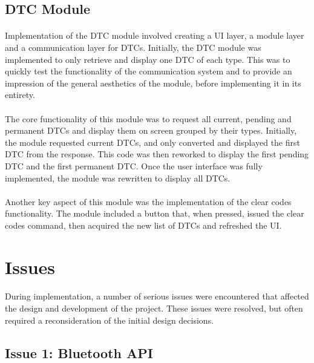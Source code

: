 	\subsection{DTC Module}
		\paragraph{}{
		Implementation of the DTC module involved creating a UI layer, a module layer and a communication layer for DTCs.	Initially, the DTC module was implemented to only retrieve and display one DTC of each type. This was to quickly test the functionality of the communication system and to provide an impression of the general aesthetics of the module, before implementing it in its entirety.
		}		
		\paragraph{}{
		The core functionality of this module was to request all current, pending and permanent DTCs and display them on screen grouped by their types. Initially, the module requested current DTCs, and only converted and displayed the first DTC from the response. This code was then reworked to display the first pending DTC and the first permanent DTC. Once the user interface was fully implemented, the module was rewritten to display all DTCs.
		}
		\paragraph{}{
		Another key aspect of this module was the implementation of the clear codes functionality. The module included a button that, when pressed, issued the clear codes command, then acquired the new list of DTCs and refreshed the UI.
		}
		
\section{Issues}
	\paragraph{}{
	During implementation, a number of serious issues were encountered that affected the design and development of the project. These issues were resolved, but often required a reconsideration of the initial design decisions.
	}
	
	\subsection{Issue 1: Bluetooth API}
